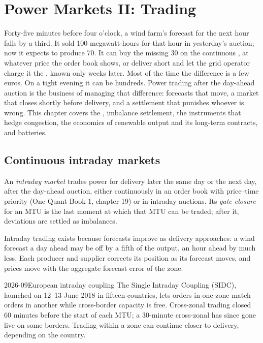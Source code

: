 \chapter{Power Markets II: Trading}\label{ch:m3:power-markets-trading}

Forty-five minutes before four o'clock, a wind farm's forecast for the next hour falls
by a third. It sold 100 megawatt-hours for that hour in yesterday's auction; now it
expects to produce 70. It can buy the missing 30 on the continuous , at
whatever price the order book shows, or deliver short and let the grid operator charge
it the , known only weeks later. Most of the time the difference is a
few euros. On a tight evening it can be hundreds. Power trading after the day-ahead
auction is the business of managing that difference: forecasts that move, a market that
closes shortly before delivery, and a settlement that punishes whoever is wrong. This
chapter covers the , imbalance settlement, the instruments that hedge
congestion, the economics of renewable output and its long-term contracts, and batteries.

\section{Continuous intraday markets}

\begin{definition}\label{def:m3:power-markets-trading:intraday}
An \emph{intraday market} trades power for delivery later the same
day or the next day, after the day-ahead auction, either continuously in an order book with
price--time priority (One Quant Book 1, chapter 19) or in intraday auctions. Its \emph{gate
closure} for an MTU is the last moment at which that MTU can be traded;
after it, deviations are settled as imbalances.
\end{definition}

Intraday trading exists because forecasts improve as delivery approaches: a wind forecast a
day ahead may be off by a fifth of the output, an hour ahead by much less. Each producer and
supplier corrects its position as its forecast moves, and prices move with the aggregate
forecast error of the zone.

\begin{dated}{2026-09}{European intraday coupling}\label{dat:m3:power-markets-trading:sidc}
The Single Intraday Coupling (SIDC), launched on 12--13 June 2018 in fifteen countries,
lets orders in one zone match orders in another while cross-border capacity is free. Cross-zonal
trading closed 60 minutes before the start of each MTU; a 30-minute cross-zonal 
has since gone live on some borders. Trading within a zone can continue closer to delivery,
depending on the country.
\end{dated}

